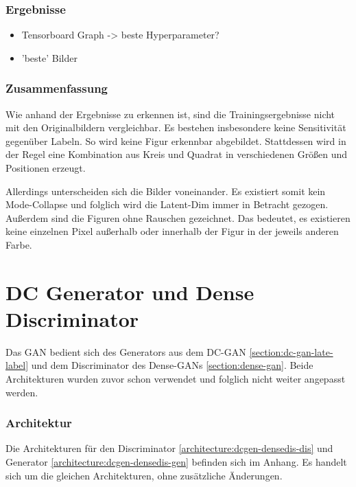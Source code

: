 \subsubsection{Ergebnisse}
\begin{itemize}
	\item Tensorboard Graph -> beste Hyperparameter?
	\item 'beste' Bilder
\end{itemize}

\subsubsection{Zusammenfassung}
Wie anhand der Ergebnisse zu erkennen ist, sind die Trainingsergebnisse nicht mit den Originalbildern vergleichbar.
Es bestehen insbesondere keine Sensitivität gegenüber Labeln.
So wird keine Figur erkennbar abgebildet.
Stattdessen wird in der Regel eine Kombination aus Kreis und Quadrat in verschiedenen Größen und Positionen erzeugt.
\newline

Allerdings unterscheiden sich die Bilder voneinander.
Es existiert somit kein Mode-Collapse und folglich wird die Latent-Dim immer in Betracht gezogen.
Außerdem sind die Figuren ohne Rauschen gezeichnet.
Das bedeutet, es existieren keine einzelnen Pixel außerhalb oder innerhalb der Figur in der jeweils anderen Farbe.



\section{DC Generator und Dense Discriminator}
Das GAN bedient sich des Generators aus dem DC-GAN \cref{section:dc-gan-late-label} und dem Discriminator des Dense-GANs \cref{section:dense-gan}.
Beide Architekturen wurden zuvor schon verwendet und folglich nicht weiter angepasst werden.

\subsubsection{Architektur}
Die Architekturen für den Discriminator \cref{architecture:dcgen-densedis-dis} und Generator \cref{architecture:dcgen-densedis-gen} befinden sich im Anhang.
Es handelt sich um die gleichen Architekturen, ohne zusätzliche Änderungen.

